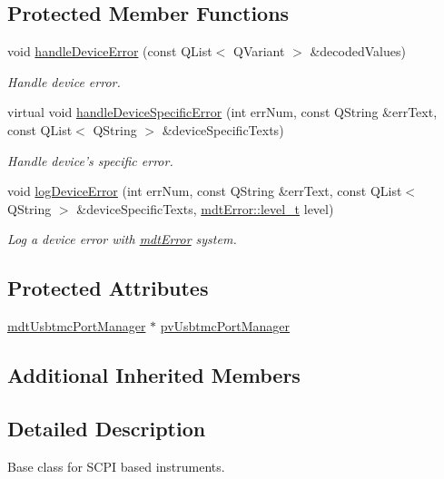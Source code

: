 \subsection*{Protected Member Functions}
\begin{DoxyCompactItemize}
\item 
void \hyperlink{classmdt_device_scpi_a16b6b0c77b1078da285f9d8d9ba52181}{handle\-Device\-Error} (const Q\-List$<$ Q\-Variant $>$ \&decoded\-Values)
\begin{DoxyCompactList}\small\item\em Handle device error. \end{DoxyCompactList}\item 
virtual void \hyperlink{classmdt_device_scpi_af1cc7d9c99832fa3a7b3c5764588c637}{handle\-Device\-Specific\-Error} (int err\-Num, const Q\-String \&err\-Text, const Q\-List$<$ Q\-String $>$ \&device\-Specific\-Texts)
\begin{DoxyCompactList}\small\item\em Handle device's specific error. \end{DoxyCompactList}\item 
void \hyperlink{classmdt_device_scpi_a00d25c16acb20c909210bc5278f713fa}{log\-Device\-Error} (int err\-Num, const Q\-String \&err\-Text, const Q\-List$<$ Q\-String $>$ \&device\-Specific\-Texts, \hyperlink{classmdt_error_a5c8b1a040e2feaa848f6201d6b6f0cd7}{mdt\-Error\-::level\-\_\-t} level)
\begin{DoxyCompactList}\small\item\em Log a device error with \hyperlink{classmdt_error}{mdt\-Error} system. \end{DoxyCompactList}\end{DoxyCompactItemize}
\subsection*{Protected Attributes}
\begin{DoxyCompactItemize}
\item 
\hyperlink{classmdt_usbtmc_port_manager}{mdt\-Usbtmc\-Port\-Manager} $\ast$ \hyperlink{classmdt_device_scpi_a6f7bd859a14eddbaab64f492777c1337}{pv\-Usbtmc\-Port\-Manager}
\end{DoxyCompactItemize}
\subsection*{Additional Inherited Members}


\subsection{Detailed Description}
Base class for S\-C\-P\-I based instruments. 

